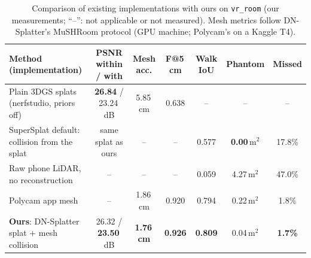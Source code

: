 \begin{table}[!htb]
\caption{Comparison of existing implementations with ours on \texttt{vr\_room} (our measurements; ``--'': not applicable or not measured). Mesh metrics follow DN-Splatter's MuSHRoom protocol (GPU machine; Polycam's on a Kaggle T4).}
\label{tab:compare}
\centering
\begin{adjustbox}{max width=\linewidth}
\begin{tabular}{L{5.2cm}cccccc}
\hline
\textbf{Method (implementation)} & \textbf{PSNR within / with} & \textbf{Mesh acc.} & \textbf{F@5\,cm} & \textbf{Walk IoU} & \textbf{Phantom} & \textbf{Missed} \\
\hline
Plain 3DGS splats \cite{kerbl3dgs} (nerfstudio, priors off) & \textbf{26.84} / 23.24\,dB & 5.85\,cm & 0.638 & -- & -- & -- \\
SuperSplat default: collision from the splat \cite{splattransform} & same splat as ours & -- & -- & 0.577 & \textbf{0.00}\,m$^2$ & 17.8\% \\
Raw phone LiDAR, no reconstruction & -- & -- & -- & 0.059 & 4.27\,m$^2$ & 47.0\% \\
Polycam app mesh \cite{polycam} & -- & 1.86\,cm & 0.920 & 0.794 & 0.22\,m$^2$ & 1.8\% \\
\textbf{Ours}: DN-Splatter splat + mesh collision & 26.32 / \textbf{23.50}\,dB & \textbf{1.76\,cm} & \textbf{0.926} & \textbf{0.809} & 0.04\,m$^2$ & \textbf{1.7\%} \\
\hline
\end{tabular}
\end{adjustbox}
\end{table}
